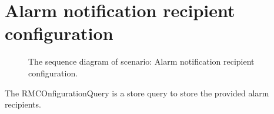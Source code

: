 \section{Alarm notification recipient configuration}

\begin{figure}
	\begin{centering}
		\caption{The sequence diagram of scenario: Alarm notification recipient configuration.}
		\label{fig:scenario-5-3-4}
	\end{centering}
\end{figure}

\npar The RMCOnfigurationQuery is a store query to store the provided alarm
recipients.
